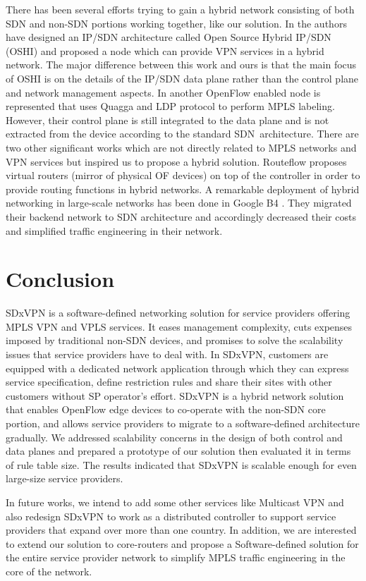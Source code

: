 \documentclass[10pt,conference]{IEEEtran}
\begin{document}
There has been several efforts trying to gain a hybrid network consisting of
both SDN and non-SDN portions working together, like our solution.
In \cite{24} the authors have designed an IP/SDN architecture called Open Source Hybrid IP/SDN (OSHI) and proposed a node which can provide VPN services in a hybrid network. The major difference between this work and ours is that the main focus of OSHI is on the details of the IP/SDN data plane rather than the control plane and network management aspects.
In \cite{26} another OpenFlow enabled node is represented that uses Quagga and LDP protocol to perform MPLS labeling. However, their control plane is still integrated to the data plane and is not extracted from the device according to the standard SDN\ architecture.  There are two other significant works which are not directly related to MPLS networks and VPN services  but inspired us to propose a hybrid solution. Routeflow \cite{25}   proposes virtual routers (mirror of physical OF devices) on top of the controller in order to provide routing functions in hybrid networks.
A remarkable deployment of hybrid networking in large-scale networks has been done in Google B4 \cite{1}.
They migrated their backend network to SDN architecture and accordingly decreased their costs and simplified traffic engineering in their network. 

\section{Conclusion}\label{sec:8}
SDxVPN is a software-defined networking solution for service providers offering MPLS VPN and VPLS services. It eases management complexity, cuts expenses imposed by traditional non-SDN devices, and promises to solve the scalability issues that service providers have to deal with. In SDxVPN, customers are equipped with a dedicated network application through which they can express  service specification, define restriction rules and share their sites with other customers without SP operator's effort. SDxVPN is a hybrid network solution that enables OpenFlow  edge devices to co-operate with the non-SDN core portion, and allows service providers to migrate to a software-defined architecture gradually. We addressed scalability concerns in the design of both control and data planes and prepared  a prototype of our solution then evaluated it in terms of rule table size. The results indicated that SDxVPN is    scalable enough for even large-size service providers.

In future works, we intend to add some other services like Multicast VPN  and also redesign SDxVPN to work as a distributed controller to support service providers that expand over more than one country. In addition, we are interested to extend our solution to  core-routers and propose a Software-defined solution for the entire service provider network to simplify   MPLS traffic  engineering  in the core of the network.
\end{document}
